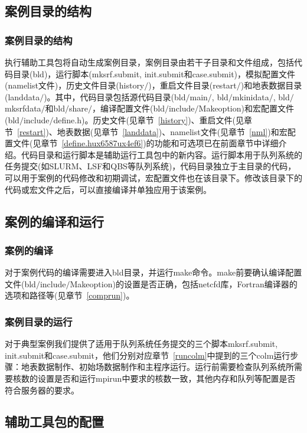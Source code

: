 \documentclass[a4paper,12pt,twoside]{article}
\begin{document}
\subsection{案例目录的结构}
\subsubsection{案例目录的结构}
执行辅助工具包将自动生成案例目录，案例目录由若干子目录和文件组成，包括代码目录(bld)，运行脚本(mksrf.submit, init.submit和case.submit)，模拟配置文件(namelist文件)，历史文件目录(history$\slash$)，重启文件目录(restart$\slash$)和地表数据目录(landdata$\slash$)。其中，代码目录包括源代码目录(bld$\slash$main$\slash$, bld$\slash$mkinidata$\slash$, bld$\slash$mksrfdata$\slash$和bld$\slash$share$\slash$，编译配置文件(bld$\slash$include$\slash$Makeoption)和宏配置文件(bld$\slash$include$\slash$define.h)。历史文件(见章节~\ref{history})、重启文件(见章节~\ref{restart})、地表数据(见章节~\ref{landdata})、namelist文件(见章节~\ref{nml})和宏配置文件(见章节~\ref{define.hux6587ux4ef6})的功能和可选项已在前面章节中详细介绍。代码目录和运行脚本是辅助运行工具包中的新内容。运行脚本用于队列系统的任务提交(如SLURM、LSF和QBS等队列系统)，代码目录独立于主目录的代码，可以用于案例的代码修改和初期调试，宏配置文件也在该目录下。修改该目录下的代码或宏文件之后，可以直接编译并单独应用于该案例。

\subsection{案例的编译和运行}
\subsubsection{案例的编译}
对于案例代码的编译需要进入bld目录，并运行make命令。make前要确认编译配置文件(bld$\slash$include$\slash$Makeoption)的设置是否正确，包括netcfd库，Fortran编译器的选项和路径等(见章节~\ref{comprun})。

\subsubsection{案例目录的运行}
对于典型案例我们提供了适用于队列系统任务提交的三个脚本mksrf.submit, init.submit和case.submit，他们分别对应章节~\ref{runcolm}中提到的三个colm运行步骤：地表数据制作、初始场数据制作和主程序运行。运行前需要检查队列系统所需要核数的设置是否和运行mpirun中要求的核数一致，其他内存和队列等配置是否符合服务器的要求。

\subsection{辅助工具包的配置}
\end{document}
